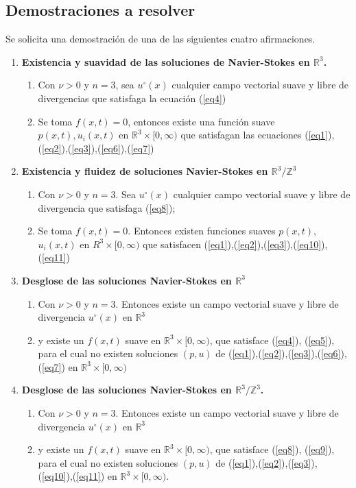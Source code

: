 \subsection{Demostraciones a resolver}
Se solicita una demostración de una de las siguientes cuatro afirmaciones.
\begin{enumerate}
    \item \textbf{Existencia y suavidad de las soluciones de Navier-Stokes en $\mathbb{R}^3$.}
    \begin{enumerate}
        \item Con $\nu>0$ y $n=3$, sea $u^{\circ}(x)$ cualquier campo vectorial suave y libre de divergencias que satisfaga la ecuación (\ref{eq4})
        \item Se toma $f(x,t)=0$, entonces existe una función suave $p(x,t),u_i(x,t)$ en $\mathbb{R}^3\times [0,\infty)$ que satisfagan las ecuaciones (\ref{eq1}),(\ref{eq2}),(\ref{eq3}),(\ref{eq6}),(\ref{eq7})
    \end{enumerate}
    \item \textbf{Existencia y fluidez de soluciones Navier-Stokes en $\mathbb{R}^3/\mathbb{Z}^3$} \begin{enumerate}
        \item Con $\nu > 0$ y $n = 3$. Sea $u^{\circ}(x)$ cualquier campo vectorial suave y libre de divergencia que satisfaga (\ref{eq8});
        \item Se toma $f(x, t)=0$. Entonces existen funciones suaves $p(x, t)$, $u_i(x, t)$ en $R^3\times [0,\infty)$ que satisfacen (\ref{eq1}),(\ref{eq2}),(\ref{eq3}),(\ref{eq10}),(\ref{eq11})
    \end{enumerate}
    \item \textbf{Desglose de las soluciones Navier-Stokes en $\mathbb{R}^3$} \begin{enumerate}
        \item  Con $\nu > 0$ y $n = 3$. Entonces existe un campo vectorial suave y libre de divergencia $u^{\circ}(x)$ en $\mathbb{R}^3$
        \item y existe un $f(x, t)$ suave en $\mathbb{R}^3 \times [0,\infty)$, que satisface (\ref{eq4}), (\ref{eq5}), para el cual no existen soluciones $(p, u)$ de (\ref{eq1}),(\ref{eq2}),(\ref{eq3}),(\ref{eq6}),(\ref{eq7}) en $\mathbb{R}^3\times [0,\infty)$
    \end{enumerate}
    \item \textbf{Desglose de las soluciones Navier-Stokes en $\mathbb{R}^3/\mathbb{Z}^3$.} \begin{enumerate}
        \item Con $\nu > 0$ y $n = 3$. Entonces existe un campo vectorial suave y libre de divergencia $u^{\circ}(x)$ en $\mathbb{R}^3$
        \item y existe un $f(x, t)$ suave en $\mathbb{R}^3 \times [0,\infty)$, que satisface (\ref{eq8}), (\ref{eq9}), para el cual no existen soluciones $(p, u)$ de (\ref{eq1}),(\ref{eq2}),(\ref{eq3}),(\ref{eq10}),(\ref{eq11}) en $\mathbb{R}^3 \times [0,\infty)$.
    \end{enumerate}
\end{enumerate}
